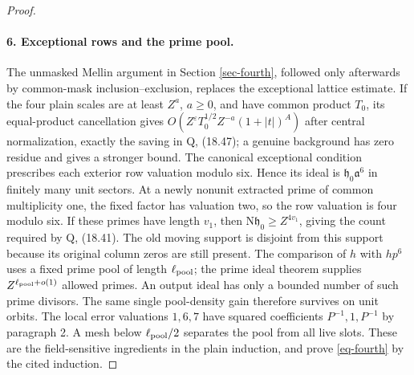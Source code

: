 \documentclass[11pt,a4paper]{article}
\theoremstyle{remark}\newtheorem{remark}[theorem]{Remark}
\newcommand{\N}{\mathrm N}
\newcommand{\eps}{\varepsilon}
\numberwithin{equation}{section}
\begin{document}
\begin{proof}
\paragraph{6. Exceptional rows and the prime pool.}
The unmasked Mellin argument in Section \ref{sec-fourth},
followed only afterwards by common-mask inclusion--exclusion,
replaces the exceptional lattice estimate. If the four plain
scales are at least $Z^a$, $a\ge0$, and have common product
$T_0$, its equal-product cancellation gives
$O(Z^\eps T_0^{1/2}Z^{-a}(1+|t|)^A)$ after central
normalization, exactly the saving in Q, (18.47); a genuine
background has zero residue and gives a stronger bound.
The canonical exceptional condition prescribes each exterior
row valuation modulo six. Hence its ideal is
$\mathfrak h_0\mathfrak a^6$ in finitely many unit sectors.
At a newly nonunit extracted prime of common multiplicity one,
the fixed factor has valuation two, so the row valuation is
four modulo six. If these primes have length $v_1$, then
$\N\mathfrak h_0\ge Z^{4v_1}$, giving the count required by
Q, (18.41). The old moving support is disjoint from this
support because its original column zeros are still present.
The comparison of $h$ with $hp^6$ uses a fixed prime pool of
length $\ell_{\rm pool}$; the prime ideal theorem supplies
$Z^{\ell_{\rm pool}+o(1)}$ allowed primes. An output ideal
has only a bounded number of such prime divisors. The same
single pool-density gain therefore survives on unit orbits.
The local error valuations $1,6,7$ have squared coefficients
$P^{-1},1,P^{-1}$ by paragraph 2. A mesh below
$\ell_{\rm pool}/2$ separates the pool from all live slots.
These are the field-sensitive ingredients in the plain
induction, and prove \eqref{eq-fourth} by the cited induction.


\end{proof}
\end{document}
